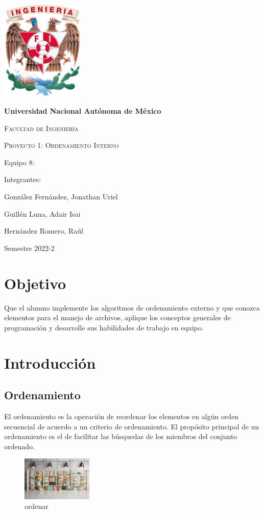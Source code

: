 \documentclass[12pt, a4paper]{article}
\begin{document}
\begin{titlepage}
\centering
{\includegraphics[width=0.3\textwidth]{Imagenes/escudo_fi_color.png}\par}
\vspace{1cm}
{\bfseries\LARGE Universidad Nacional Autónoma de México\par}
\vspace{1cm}
{\scshape\Large Facultad de Ingeniería  \par}
\vspace{2cm}
{\scshape\Huge Proyecto 1: Ordenamiento Interno  \par}
\vspace{2cm}
\vfill
\raggedright
{\Large  Equipo 8: \par}
{\Large Integrantes: \par}
{\Large González Fernández, Jonathan Uriel \par}
{\Large Guillén Luna, Adair Isai \par}
{\Large Hernández Romero, Raúl \par}
\vfill
\raggedleft
{\Large Semestre 2022-2\par}
\end{titlepage}

\tableofcontents
\newpage
\section{Objetivo}\label{sec:objetivo}
Que el alumno implemente los algoritmos de ordenamiento externo y que conozca elementos para el manejo de archivos, aplique los conceptos generales de programación y desarrolle sus habilidades de trabajo en equipo.
\section{Introducción}\label{sec:intro}
\subsection{Ordenamiento}\label{subsec:ordenamiento}
El ordenamiento es la operación de reordenar los elementos en algún orden secuencial de acuerdo a un criterio de  ordenamiento. El propósito principal de un ordenamiento es el de facilitar las búsquedas de los miembros del conjunto ordenado.
\begin{figure}[h]
    \centering
    \includegraphics[width=0.3\textwidth]{Imagenes/ordenar.jpg}
    \caption{ordenar}
    \label{fig:img_orden}
\end{figure}
\end{document}
